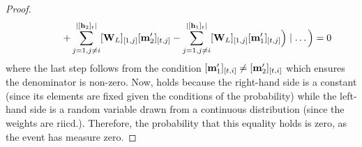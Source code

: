\begin{proof}
\begin{subequations}
\begin{align}
        &\,\,\qquad\qquad{+\sum_{j=1,j\neq i}^{|[\mathbf{h}_2]_t|}[\mathbf{W}_{L}]_{[1,j]}[\mathbf{m}'_{2}]_{[t,j]}-\sum^{|[\mathbf{h}_1]_t|}_{j=1,j\neq i}[\mathbf{W}_{L}]_{[1,j]}[\mathbf{m}'_{1}]_{[t,j]}}\Big)\mid \ldots\Big)=0 \nonumber
    \end{align}
    \end{subequations}
    where the last step follows from the condition $[\mathbf{m}'_{1}]_{[t,i]}\neq[\mathbf{m}'_{2}]_{[t,i]}$ which ensures the denominator is non-zero. 
    Now,  holds because the right-hand side is a constant (since its elements are fixed given the conditions of the probability) while the left-hand side is a random variable drawn from a continuous distribution (since the weights are riicd.). Therefore, the probability that this equality holds is zero, as the event has measure zero.
\end{proof}

